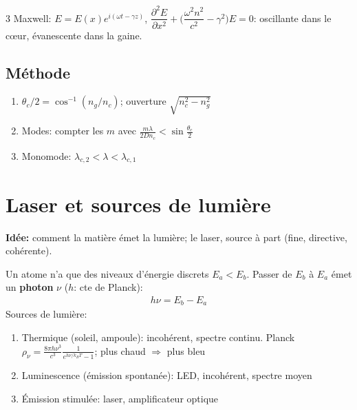 \documentclass[12pt, a4paper]{article}
\begin{document}
\begin{multicols*}{3}
	Maxwell: $E=E(x)e^{i(\omega t-\gamma z)}$, $\dfrac{\partial^2E}{\partial x^2}+\Big(\dfrac{\omega^2n^2}{c^2}-\gamma^2\Big)E=0$: oscillante dans le cœur, évanescente dans la gaine.

	\subsection{Méthode}
	\begin{enumerate}[\roman*.]
		\item $\theta_c/2=\cos^{-1}(n_g/n_c)$; ouverture $\sqrt{n_c^2-n_g^2}$
		\item Modes: compter les $m$ avec $\frac{m\lambda}{2Dn_c}<\sin\frac{\theta_c}{2}$
		\item Monomode: $\lambda_{c,2}<\lambda<\lambda_{c,1}$
	\end{enumerate}

	\colbreak
	\section{Laser et sources de lumière}
	\textbf{Idée:} comment la matière émet la lumière; le laser, source à part (fine, directive, cohérente).

	Un atome n'a que des niveaux d'énergie discrets $E_a<E_b$. Passer de $E_b$ à $E_a$ émet un \textbf{photon} $\nu$ ($h$: cte de Planck):
	\begin{gather*}
		h\nu=E_b-E_a
	\end{gather*}
	Sources de lumière:
	\begin{enumerate}[\roman*.]
		\item Thermique (soleil, ampoule): incohérent, spectre continu. Planck $\rho_\nu=\frac{8\pi h\nu^3}{c^3}\frac{1}{e^{h\nu/k_BT}-1}$; plus chaud $\Rightarrow$ plus bleu
		\item Luminescence (émission spontanée): LED, incohérent, spectre moyen
		\item Émission stimulée: laser, amplificateur optique
	\end{enumerate}


\end{multicols*}
\end{document}
